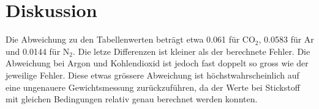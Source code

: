 \documentclass[12pt,a4paper]{article}
\begin{document}
\section*{Diskussion}
Die Abweichung zu den Tabellenwerten betr\"agt etwa 0.061 f\"ur CO$_2$, 0.0583 f\"ur Ar und 0.0144 f\"ur N$_2$. Die letze Differenzen ist kleiner als der berechnete Fehler. Die Abweichung bei Argon und Kohlendioxid ist jedoch fast doppelt so gross wie der jeweilige Fehler. Diese etwas gr\"ossere Abwei\-chung ist h\"ochstwahrscheinlich auf eine ungenauere Gewichtsmessung zur\"uckzuf\"uhren, da der Werte bei Stickstoff mit gleichen Bedingungen relativ genau berechnet werden konnten.
\end{document}

